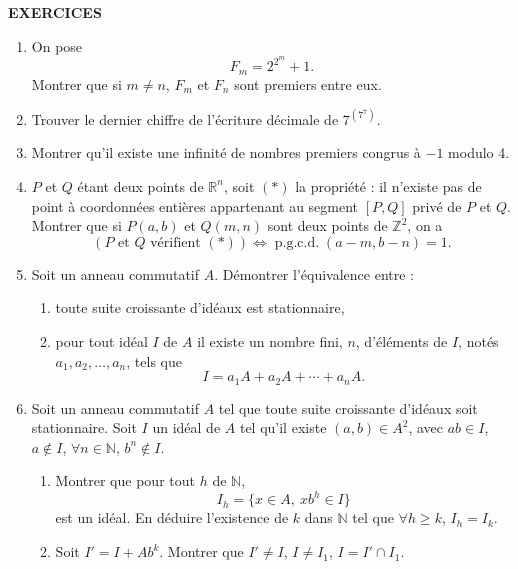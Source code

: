
\begin{center}
{\Large\sffamily\bfseries\color{BellaLavenderDeep} EXERCICES}
\end{center}
\vspace{0.8em}

\begin{enumerate}[label=\arabic*.,leftmargin=2.2em,itemsep=1.1em]

\item On pose
\[
F_m=2^{2^m}+1.
\]
Montrer que si $m\ne n$, $F_m$ et $F_n$ sont premiers entre eux.

\item Trouver le dernier chiffre de l'écriture décimale de $7^{(7^7)}$.

\item Montrer qu'il existe une infinité de nombres premiers congrus à $-1$ modulo 4.

\item $P$ et $Q$ étant deux points de $\mathbb R^n$, soit $(*)$ la propriété : il n'existe pas de point à coordonnées entières appartenant au segment $[P,Q]$ privé de $P$ et $Q$. Montrer que si $P(a,b)$ et $Q(m,n)$ sont deux points de $\mathbb Z^2$, on a
\[
(P\text{ et }Q\text{ vérifient }(*))\Longleftrightarrow\operatorname{p.g.c.d.}(a-m,b-n)=1.
\]

\item Soit un anneau commutatif $A$. Démontrer l'équivalence entre :
\begin{enumerate}[label=\alph*),leftmargin=2em]
\item toute suite croissante d'idéaux est stationnaire,
\item pour tout idéal $I$ de $A$ il existe un nombre fini, $n$, d'éléments de $I$, notés $a_1,a_2,\ldots,a_n$, tels que
\[
I=a_1A+a_2A+\cdots+a_nA.
\]
\end{enumerate}

\item Soit un anneau commutatif $A$ tel que toute suite croissante d'idéaux soit stationnaire. Soit $I$ un idéal de $A$ tel qu'il existe $(a,b)\in A^2$, avec $ab\in I$, $a\notin I$, $\forall n\in\mathbb N$, $b^n\notin I$.
\begin{enumerate}[label=\alph*),leftmargin=2em]
\item Montrer que pour tout $h$ de $\mathbb N$,
\[
I_h=\{x\in A,\ xb^h\in I\}
\]
est un idéal. En déduire l'existence de $k$ dans $\mathbb N$ tel que $\forall h\ge k$, $I_h=I_k$.
\item Soit $I'=I+Ab^k$. Montrer que $I'\ne I$, $I\ne I_1$, $I=I'\cap I_1$.
\end{enumerate}


\end{enumerate}
